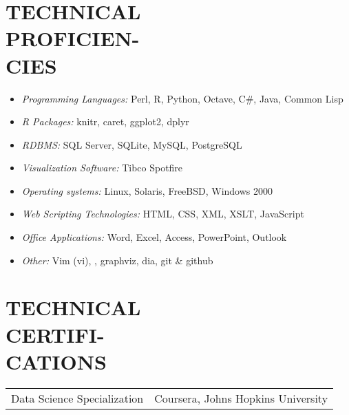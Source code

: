 \documentclass[margin, 10pt]{res} %
\begin{document}
\begin{resume}

\section{TECHNICAL\\ PROFICIEN-\\ CIES}

\begin{itemize} \itemsep -2pt %

\item {\it Programming Languages:} Perl, \textsf{R}, Python, Octave, C\#, Java, Common Lisp
\item {\it \textsf{R} Packages:} knitr, caret, ggplot2, dplyr
\item {\it RDBMS:} SQL Server, SQLite, MySQL, PostgreSQL
\item {\it Visualization Software:} Tibco Spotfire
\item {\it Operating systems:} Linux, Solaris, FreeBSD, Windows 2000
\item {\it Web Scripting Technologies:} HTML, CSS, XML, XSLT, JavaScript
\item {\it Office Applications:} Word, Excel, Access, PowerPoint, Outlook
\item {\it Other:} Vim (vi), \LaTeXe, graphviz, dia, git \& github
\end{itemize}

 


\section{TECHNICAL\\CERTIFI-\\CATIONS}

\small
    \begin{tabular}{l l }
    Data Science Specialization & Coursera, Johns Hopkins University\\


\end{tabular}
\end{resume}
\end{document}
